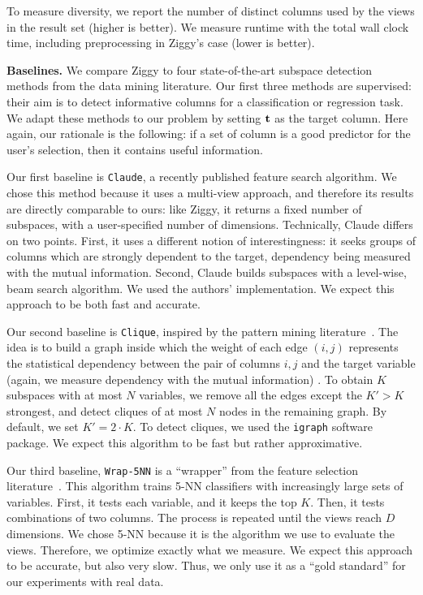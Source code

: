 To measure diversity, we report the number of distinct columns used by the
views in the result set (higher is better). We measure runtime with the total
wall clock time, including preprocessing in Ziggy's case (lower is better).

\textbf{Baselines.} We compare Ziggy to four state-of-the-art subspace
detection methods from the data mining literature. Our first three methods are
supervised: their aim is to detect informative columns for a classification or
regression task.  We adapt these methods to our problem by setting $\bf{t}$ as
the target column. Here again, our rationale is the following: if a set of
column is a good predictor for the user's selection, then it contains useful
information.

Our first baseline is \texttt{Claude}, a recently published feature search
algorithm. We chose this method because it uses a multi-view approach, and
therefore its results are directly comparable to ours: like Ziggy, it returns a
fixed number of subspaces, with a user-specified number of dimensions.
Technically, Claude differs on two points. First, it uses a different notion of
interestingness: it seeks groups of columns which are strongly dependent to the
target, dependency being measured with the mutual information. Second, Claude
builds subspaces with a level-wise, beam search algorithm. We used the authors'
implementation.  We expect this approach to be both fast and accurate.

Our second baseline is \texttt{Clique}, inspired by the pattern mining
literature~\cite{xie2010max}. The idea is to build a graph inside which the
weight of each edge $(i,j)$ represents the statistical dependency between the
pair of columns $i,j$ and the target variable (again, we measure dependency
with the mutual information) . To obtain $K$ subspaces with at most $N$
variables, we remove all the edges except the $K' > K$ strongest, and detect
cliques of at most $N$ nodes in the remaining graph. By default, we set $K' =
2\cdot K$. To detect cliques, we used the \texttt{igraph} software package. We
expect this algorithm to be fast but rather approximative.

Our third baseline, \texttt{Wrap-5NN} is a ``wrapper'' from the feature
selection literature~\cite{guyon2003introduction}. This algorithm trains 5-NN
classifiers with increasingly large sets of variables. First, it tests each
variable, and it keeps the top $K$. Then, it tests combinations of two columns.
The process is repeated until the views reach $D$ dimensions. We chose 5-NN
because it is the algorithm we use to evaluate the views. Therefore, we
optimize exactly what we measure. We expect this approach to be accurate, but
also very slow. Thus, we only use it as a ``gold standard'' for our experiments
with real data.

